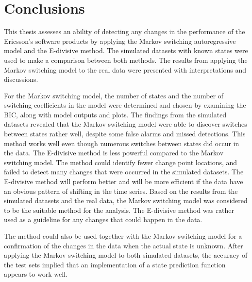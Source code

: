 
\lhead[\chaptername~\thechapter]{\rightmark}

\rhead[\leftmark]{}

\lfoot[\thepage]{}

\cfoot{}

\rfoot[]{\thepage}

\chapter{Conclusions }

This thesis assesses an ability of detecting any changes in the performance
of the Ericsson's software products by applying the Markov switching
autoregressive model and the E-divisive method. The simulated datasets
with known states were used to make a comparison between both methods.
The results from applying the Markov switching model to the real data
were presented with interpretations and discussions. 

For the Markov switching model, the number of states and the number
of switching coefficients in the model were determined and chosen
by examining the BIC, along with model outputs and plots. The findings
from the simulated datasets revealed that the Markov switching model
were able to discover switches between states rather well, despite
some false alarms and missed detections. This method works well even
though numerous switches between states did occur in the data. The
E-divisive method is less powerful compared to the Markov switching
model. The method could identify fewer change point locations, and
failed to detect many changes that were occurred in the simulated
datasets. The E-divisive method will perform better and will be more
efficient if the data have an obvious pattern of shifting in the time
series. Based on the results from the simulated datasets and the real
data, the Markov switching model was considered to be the suitable
method for the analysis. The E-divisive method was rather used as
a guideline for any changes that could happen in the data. %
\begin{comment}
and also a confirmation for the changes in the CPU state.
\end{comment}
The method could also be used together with the Markov switching model
for a confirmation of the changes in the data when the actual state
is unknown. After applying the Markov switching model to both simulated
datasets, the accuracy of the test sets implied that an implementation
of a state prediction function appears to work well. %
\begin{comment}
Moreover, an implementation of a state prediction function appears
to functionally work well when investigating on the simulated datasets.
The accuracy from both simulated datasets were high. 
\end{comment}

